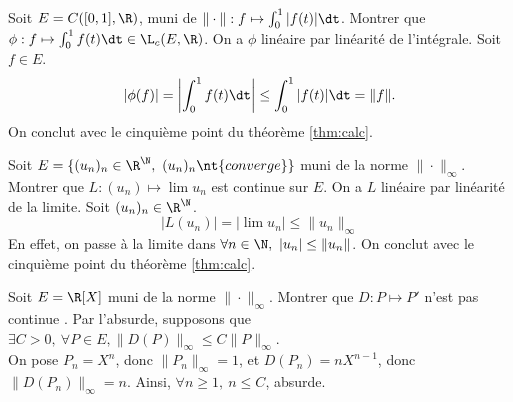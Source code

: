 \documentclass[11pt]{article}
\begin{document}
\begin{ex}{}{}
    Soit $E=C([0,1],\R)$, muni de $\|\cdot\|:f\mapsto\int_0^1|f(t)|\dt$. Montrer que $\phi : f \mapsto \int_0^1f(t)\dt\in\L_c(E,\R)$. 
    \tcblower
    On a $\phi$ linéaire par linéarité de l'intégrale. Soit $f\in E$.
    \begin{equation*}
        |\phi(f)| = \left|\int_0^1f(t)\dt\right| \leq \int_0^1|f(t)|\dt = \|f\|.
    \end{equation*}
    On conclut avec le cinquième point du théorème \ref{thm:calc}.
\end{ex}

\vspace*{-0.7cm}

\begin{ex}{}{}
    Soit $E=\{(u_n)_n \in \R^\N, ~ (u_n)_n \nt{ converge}\}$ muni de la norme $\|\cdot\|_{\infty}$. Montrer que $L:(u_n)\mapsto\lim u_n$ est continue sur $E$.
    \tcblower
    On a $L$ linéaire par linéarité de la limite. Soit $(u_n)_n \in \R^\N$.
    \begin{equation*}
        |L(u_n)| = \left|\lim u_n\right| \leq \|u_n\|_\infty
    \end{equation*}
    En effet, on passe à la limite dans $\forall n \in \N, ~ |u_n|\leq\|u_n\|$. On conclut avec le cinquième point du théorème \ref{thm:calc}.
\end{ex}

\begin{ex}{}{}
    Soit $E=\R[X]$ muni de la norme $\|\cdot\|_\infty$. Montrer que $D:P\mapsto P'$ n'est pas continue .
    \tcblower
    Par l'absurde, supposons que $\exists C > 0, ~ \forall P \in E, \|D(P)\|_\infty \leq C\|P\|_\infty$.\\
    On pose $P_n = X^n$, donc $\|P_n\|_\infty=1$, et $D(P_n)=nX^{n-1}$, donc $\|D(P_n)\|_\infty=n$. Ainsi, $\forall n \geq 1, ~ n \leq C$, absurde.
\end{ex}

\vspace*{-0.8cm}
\end{document}
